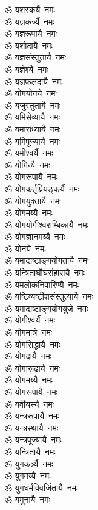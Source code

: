 \begin{flushleft}
\begin{multicols}{2}
ॐ यशस्कर्यै~नमः\\
ॐ यज्ञकर्त्र्यै~नमः\\
ॐ यज्ञरूपायै~नमः\\
ॐ यशोदायै~नमः\hfill{}\\
ॐ यज्ञसंस्तुतायै~नमः\\
ॐ यज्ञेश्यै~नमः\\
ॐ यज्ञफलदायै~नमः\\
ॐ योगयोनये~नमः\\
ॐ यजुस्तुतायै~नमः\\
ॐ यमिसेव्यायै~नमः\\
ॐ यमाराध्यायै~नमः\\
ॐ यमिपूज्यायै~नमः\\
ॐ यमीश्वर्यै~नमः\\
ॐ योगिन्यै~नमः\hfill{}\\
ॐ योगरूपायै~नमः\\
ॐ योगकर्तृप्रियङ्कर्यै~नमः\\
ॐ योगयुक्तायै~नमः\\
ॐ योगमय्यै~नमः\\
ॐ योगयोगीश्वराम्बिकायै~नमः\\
ॐ योगज्ञानमय्यै~नमः\\
ॐ योनये~नमः\\
ॐ यमाद्यष्टाङ्गयोगतायै~नमः\\
ॐ यन्त्रिताघौघसंहारायै~नमः\\
ॐ यमलोकनिवारिण्यै~नमः\hfill{}\\
ॐ यष्टिव्यष्टीशसंस्तुत्यायै~नमः\\
ॐ यमाद्यष्टाङ्गयोगयुजे~नमः\\
ॐ योगीश्वर्यै~नमः\\
ॐ योगमात्रे~नमः\\
ॐ योगसिद्धायै~नमः\\
ॐ योगदायै~नमः\\
ॐ योगारूढायै~नमः\\
ॐ योगमय्यै~नमः\\
ॐ योगरूपायै~नमः\\
ॐ यवीयस्यै~नमः\hfill{}\\
ॐ यन्त्ररूपायै~नमः\\
ॐ यन्त्रस्थायै~नमः\\
ॐ यन्त्रपूज्यायै~नमः\\
ॐ यन्त्रितायै~नमः\\
ॐ युगकर्त्र्यै~नमः\\
ॐ युगमय्यै~नमः\\
ॐ युगधर्मविवर्जितायै~नमः\\
ॐ यमुनायै~नमः\\

\end{multicols}
\end{flushleft}
